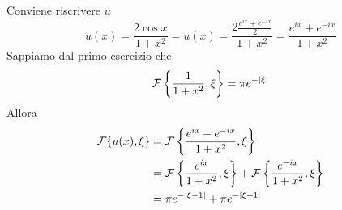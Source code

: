 Conviene riscrivere $u$
\begin{equation*}
u( x) =\frac{2\cos x}{1+x^{2}} =u( x) =\frac{2\frac{e^{ix} +e^{-ix}}{2}}{1+x^{2}} =\frac{e^{ix} +e^{-ix}}{1+x^{2}}
\end{equation*}
Sappiamo dal primo esercizio che
\begin{equation*}
\mathcal{F} \left\{\frac{1}{1+x^{2}} ,\xi \right\} =\pi e^{-| \xi | }
\end{equation*}
Allora
\begin{equation*}
\begin{aligned}
\mathcal{F} \{u( x) ,\xi \} & =\mathcal{F} \left\{\frac{e^{ix} +e^{-ix}}{1+x^{2}} ,\xi \right\}\\
 & =\mathcal{F} \left\{\frac{e^{ix}}{1+x^{2}} ,\xi \right\} +\mathcal{F} \left\{\frac{e^{-ix}}{1+x^{2}} ,\xi \right\}\\
 & =\pi e^{-| \xi -1| } +\pi e^{-| \xi +1| }
\end{aligned}
\end{equation*}
\Soluzione


